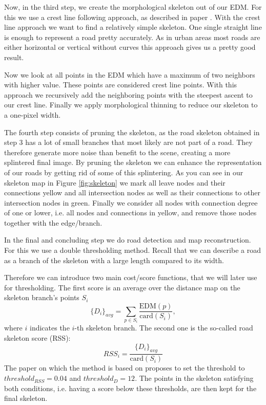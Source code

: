 \documentclass[10pt,conference,compsocconf]{IEEEtran}
\newcommand{\figref}[1]{Figure \ref{#1}}
\begin{document}
Now, in the third step, we create the morphological skeleton out of our EDM. For this we use a crest line following approach, as described in paper \cite{GaZeScPo11}. With the crest line approach we want to find a relatively simple skeleton. One single straight line is enough to represent a road pretty accurately. As in urban areas most roads are either horizontal or vertical without curves this approach gives us a pretty good result. 

Now we look at all points in the EDM which have a maximum of two neighbors with higher value. These points are considered crest line points. With this approach we recursively add the neighboring points with the steepest ascent to our crest line. Finally we apply morphological thinning to reduce our skeleton to a one-pixel width.

The fourth step consists of pruning the skeleton, as the road skeleton obtained in step 3 has a lot of small branches that most likely are not part of a road. They therefore generate more noise than benefit to the scene, creating a more splintered final image. By pruning the skeleton we can enhance the representation of our roads by getting rid of some of this splintering. As you can see in our skeleton map in \figref{fig:skeleton} we mark all leave nodes and their connections yellow and all intersection nodes as well as their connections to other intersection nodes in green. Finally we consider all nodes with connection degree of one or lower, i.e. all nodes and connections in yellow, and remove those nodes together with the edge/branch.

In the final and concluding step we do road detection and map reconstruction. For this we use a double thresholding method. Recall that we can describe a road as a branch of the skeleton with a large length compared to its width. 

Therefore we can introduce two main cost/score functions, that we will later use for thresholding. The first score is an average over the distance map on the skeleton branch's points $S_{i}$
$$
\{D_i\}_{avg} = \sum_{p \in S_{i}}{\frac{\textrm{EDM}(p)}{\textrm{card}(S_{i})}},
$$
where $i$ indicates the $i$-th skeleton branch. The second one is the so-called road skeleton score (RSS):
$$
RSS_{i} = \frac{{\{D_i\}}_{avg}}{\textrm{card}(S_{i})}
$$
The paper on which the method is based on \cite{GaZeScPo11} proposes to set the threshold to $threshold_{RSS} = 0.04$ and $threshold_{D} = 12$. The points in the skeleton satisfying both conditions, i.e. having a score below these thresholds, are then kept for the final skeleton.
\end{document}
